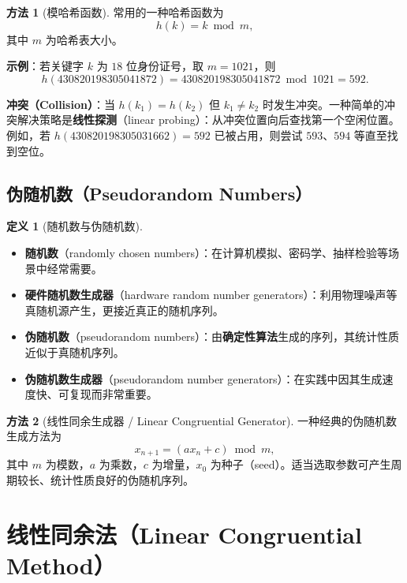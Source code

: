 \documentclass[UTF8,11pt,a4paper]{ctexbook}   %
\theoremstyle{definition}
\newtheorem{definition}{定义}[section]
\newtheorem{method}{方法}[section]
\begin{document}
\begin{method}[模哈希函数]
常用的一种哈希函数为
\[
h(k) = k \bmod m,
\]
其中 $m$ 为哈希表大小。

\textbf{示例}：若关键字 $k$ 为 $18$ 位身份证号，取 $m=1021$，则
\[
h(430820198305041872) = 430820198305041872 \bmod 1021 = 592.
\]

\textbf{冲突（Collision）}：当 $h(k_1) = h(k_2)$ 但 $k_1 \neq k_2$ 时发生冲突。一种简单的冲突解决策略是\textbf{线性探测}（linear probing）：从冲突位置向后查找第一个空闲位置。例如，若 $h(430820198305031662) = 592$ 已被占用，则尝试 $593$、$594$ 等直至找到空位。
\end{method}

\subsection{伪随机数（Pseudorandom Numbers）}

\begin{definition}[随机数与伪随机数]
\begin{itemize}
    \item \textbf{随机数}（randomly chosen numbers）：在计算机模拟、密码学、抽样检验等场景中经常需要。
    \item \textbf{硬件随机数生成器}（hardware random number generators）：利用物理噪声等真随机源产生，更接近真正的随机序列。
    \item \textbf{伪随机数}（pseudorandom numbers）：由\textbf{确定性算法}生成的序列，其统计性质近似于真随机序列。
    \item \textbf{伪随机数生成器}（pseudorandom number generators）：在实践中因其生成速度快、可复现而非常重要。
\end{itemize}
\end{definition}

\begin{method}[线性同余生成器 / Linear Congruential Generator]
一种经典的伪随机数生成方法为
\[
x_{n+1} = (a x_n + c) \bmod m,
\]
其中 $m$ 为模数，$a$ 为乘数，$c$ 为增量，$x_0$ 为种子（seed）。适当选取参数可产生周期较长、统计性质良好的伪随机序列。
\end{method}

\section{线性同余法（Linear Congruential Method）}
\end{document}
